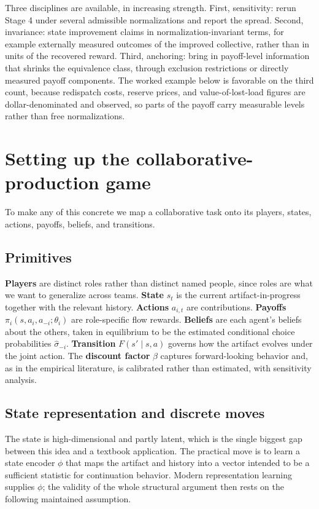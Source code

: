 \documentclass[11pt]{article}
\theoremstyle{definition}
\begin{document}
Three disciplines are available, in increasing strength. First, sensitivity: rerun Stage 4 under several admissible normalizations and report the spread. Second, invariance: state improvement claims in normalization-invariant terms, for example externally measured outcomes of the improved collective, rather than in units of the recovered reward. Third, anchoring: bring in payoff-level information that shrinks the equivalence class, through exclusion restrictions or directly measured payoff components. The worked example below is favorable on the third count, because redispatch costs, reserve prices, and value-of-lost-load figures are dollar-denominated and observed, so parts of the payoff carry measurable levels rather than free normalizations.

\section{Setting up the collaborative-production game}

To make any of this concrete we map a collaborative task onto its players, states, actions, payoffs, beliefs, and transitions.

\subsection{Primitives}

\textbf{Players} are distinct roles rather than distinct named people, since roles are what we want to generalize across teams. \textbf{State} $s_t$ is the current artifact-in-progress together with the relevant history. \textbf{Actions} $a_{i,t}$ are contributions. \textbf{Payoffs} $\pi_i(s,a_i,a_{-i};\theta_i)$ are role-specific flow rewards. \textbf{Beliefs} are each agent's beliefs about the others, taken in equilibrium to be the estimated conditional choice probabilities $\hat\sigma_{-i}$. \textbf{Transition} $F(s'\mid s,a)$ governs how the artifact evolves under the joint action. The \textbf{discount factor} $\beta$ captures forward-looking behavior and, as in the empirical literature, is calibrated rather than estimated, with sensitivity analysis.

\subsection{State representation and discrete moves}

The state is high-dimensional and partly latent, which is the single biggest gap between this idea and a textbook application. The practical move is to learn a state encoder $\phi$ that maps the artifact and history into a vector intended to be a sufficient statistic for continuation behavior. Modern representation learning supplies $\phi$; the validity of the whole structural argument then rests on the following maintained assumption.
\end{document}
